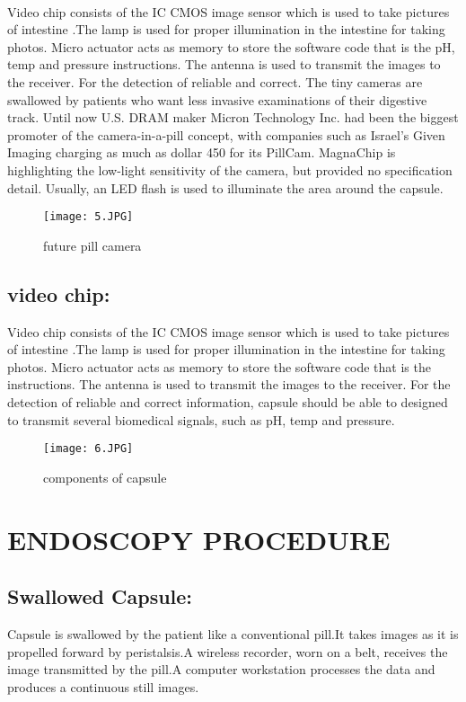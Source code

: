 \documentclass{article}
\begin{document}
\\Video chip consists of the IC CMOS image sensor which is used to take pictures of intestine .The lamp is used for proper illumination in the intestine for taking photos. Micro actuator acts as memory to store the software code that is the pH, temp and pressure instructions. The antenna is used to transmit the images to the receiver. For the detection of reliable and correct.
The tiny cameras are swallowed by patients who want less invasive examinations of their digestive track. Until now U.S. DRAM maker Micron Technology Inc. had been the biggest promoter of the camera-in-a-pill concept, with companies such as Israel's Given Imaging charging as much as dollar 450 for its PillCam. MagnaChip is highlighting the low-light sensitivity of the camera, but provided no specification detail. Usually, an LED flash is used to illuminate the area around the capsule.

\begin{figure}[h]
    \centering
    \texttt{[image: 5.JPG]}
    \caption{future pill camera}
\end{figure}

\subsection{video chip:}
Video chip consists of the IC CMOS image sensor which is used to take pictures of intestine .The lamp is used for proper illumination in the intestine for taking photos. Micro actuator acts as memory to store the software code that is the instructions. The antenna is used to transmit the images to the receiver. For the detection of reliable and correct information, capsule should be able to designed to transmit several biomedical signals, such as pH, temp and pressure.


\begin{figure}[h]
    \centering
    \texttt{[image: 6.JPG]}
    \caption{components of capsule}
\end{figure}

\section{ENDOSCOPY PROCEDURE}
\subsection{Swallowed Capsule:}
Capsule is swallowed by the patient like a conventional pill.It takes images as it is propelled forward by peristalsis.A wireless recorder, worn on a belt, receives the image transmitted by the pill.A computer workstation processes the data and produces a continuous still images.
\end{document}
